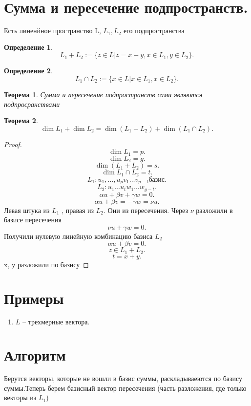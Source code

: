 \documentclass{scrartcl}
\newtheorem{theorem}{Теорема}
\newtheorem{definition}{Определение}
\begin{document}
\section{Сумма и пересечение подпространств.}
Есть линенйное пространство L, $L_1,L_2$  его подпространства
\begin{definition}
	\[
		L_1 + L_2 := \{z  \in L | z = x + y, x \in L_1, y \in L_2\}
		.\]
\end{definition}
\begin{definition}
	\[
		L_1 \cap L_2 := \{x \in L | x \in L_1,x\in L_2\}
		.\]
\end{definition}
\begin{theorem}
	Сумма и пересечение подпространств сами являются подпросранствами
\end{theorem}
\begin{theorem}
	\[
		\dim{L_1} + \dim{L_2} = \dim{(L_1 +  L_2)} + \dim{(L_1 \cap L_2)}
		.\]
\end{theorem}
\begin{proof}
	\[
		\dim{L_1} = p
		.\]
	\[
		\dim{L_2}  = g
		.\]
	\[
		\dim{(L_1 + L_2)} = s
		.\]
	\[
		\dim{L_1 \cap L_2} = t
		.\]
	\[
		L_1 : u_1,\dots ,u_{p} v_1 \dots v_{p - t} \text{базис}
		.\]
	\[
		L_2 : u_1 \dots u_{t} w_1 \dots w_{g - t}
		.\]
	\[
		\alpha u + \beta v  + \gamma w =  0
		.\]
	\[
		\alpha u + \beta v  = -\gamma w = \nu u
		.\]
	Левая штука из $L_1$ , правая из $L_2$. Они из пересечения. Через $\nu$ разложили в базисе пересечения
	\[
		\nu u + \gamma w = 0
		.\]
	Получили нулевую линейную комбинацию базиса $L_2$
	\[
		\alpha u + \beta v = 0
		.\]
	\[
		z \in L_1 + L_2
		.\]
	\[
		t = x + y
		.\]
	x, y разложили по базису
\end{proof}
\section{Примеры}
\begin{enumerate}
	\item $L$ -- трехмерные вектора.
\end{enumerate}
\section{Алгоритм}
Берутся векторы, которые не вошли в базис суммы, раскладываеются по базису суммы.Теперь берем базисный вектор пересечения (часть разложения, где только векторы из $L_1$)
\end{document}
